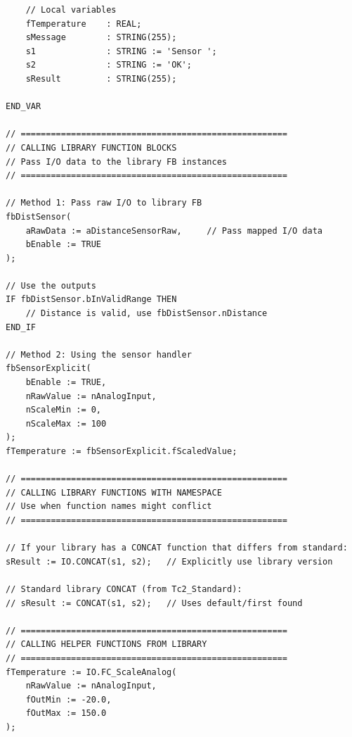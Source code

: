 \documentclass[11pt,a4paper]{article}
\begin{document}
\begin{lstlisting}
    // Local variables
    fTemperature    : REAL;
    sMessage        : STRING(255);
    s1              : STRING := 'Sensor ';
    s2              : STRING := 'OK';
    sResult         : STRING(255);
    
END_VAR

// =====================================================
// CALLING LIBRARY FUNCTION BLOCKS
// Pass I/O data to the library FB instances
// =====================================================

// Method 1: Pass raw I/O to library FB
fbDistSensor(
    aRawData := aDistanceSensorRaw,     // Pass mapped I/O data
    bEnable := TRUE
);

// Use the outputs
IF fbDistSensor.bInValidRange THEN
    // Distance is valid, use fbDistSensor.nDistance
END_IF

// Method 2: Using the sensor handler
fbSensorExplicit(
    bEnable := TRUE,
    nRawValue := nAnalogInput,
    nScaleMin := 0,
    nScaleMax := 100
);
fTemperature := fbSensorExplicit.fScaledValue;

// =====================================================
// CALLING LIBRARY FUNCTIONS WITH NAMESPACE
// Use when function names might conflict
// =====================================================

// If your library has a CONCAT function that differs from standard:
sResult := IO.CONCAT(s1, s2);   // Explicitly use library version

// Standard library CONCAT (from Tc2_Standard):
// sResult := CONCAT(s1, s2);   // Uses default/first found

// =====================================================
// CALLING HELPER FUNCTIONS FROM LIBRARY
// =====================================================
fTemperature := IO.FC_ScaleAnalog(
    nRawValue := nAnalogInput,
    fOutMin := -20.0,
    fOutMax := 150.0
);
\end{lstlisting}
\end{document}
